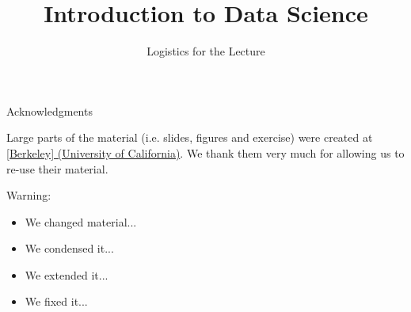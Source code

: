 \documentclass[aspectratio=169]{../latex_main/tntbeamer}  %
\title[Introduction]{Introduction to Data Science}
\subtitle{Logistics for the Lecture}
\begin{document}
	
	\maketitle

\begin{frame}[c]{Acknowledgments}

Large parts of the material (i.e. slides, figures and exercise) were created at \href{https://ds100.org/}{[Berkeley] (University of California)}. We thank them very much for allowing us to re-use their material.

\bigskip

\alert{Warning}:
\begin{itemize}
    \item We changed material...
    \item We condensed it...
    \item We extended it...
    \item We fixed it...
\end{itemize}


\end{frame}
\end{document}
